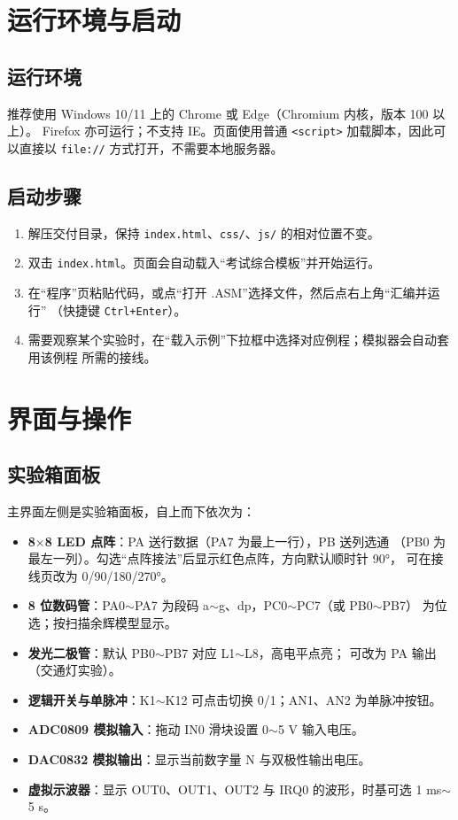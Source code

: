 \documentclass[11pt,a4paper]{ctexart}
\begin{document}
\section{运行环境与启动}

\subsection{运行环境}

推荐使用 Windows 10/11 上的 Chrome 或 Edge（Chromium 内核，版本 100 以上）。
Firefox 亦可运行；不支持 IE。页面使用普通 \texttt{<script>} 加载脚本，因此可以直接以
\texttt{file://} 方式打开，不需要本地服务器。

\subsection{启动步骤}

\begin{enumerate}
  \item 解压交付目录，保持 \texttt{index.html}、\texttt{css/}、\texttt{js/} 的相对位置不变。
  \item 双击 \texttt{index.html}。页面会自动载入“考试综合模板”并开始运行。
  \item 在“程序”页粘贴代码，或点“打开 .ASM”选择文件，然后点右上角“汇编并运行”
        （快捷键 \texttt{Ctrl+Enter}）。
  \item 需要观察某个实验时，在“载入示例”下拉框中选择对应例程；模拟器会自动套用该例程
        所需的接线。
\end{enumerate}

\section{界面与操作}

\subsection{实验箱面板}

主界面左侧是实验箱面板，自上而下依次为：

\begin{itemize}
  \item \textbf{8$\times$8 LED 点阵}：PA 送行数据（PA7 为最上一行），PB 送列选通
        （PB0 为最左一列）。勾选“点阵接法”后显示红色点阵，方向默认顺时针 90°，
        可在接线页改为 0/90/180/270°。
  \item \textbf{8 位数码管}：PA0$\sim$PA7 为段码 a$\sim$g、dp，PC0$\sim$PC7（或 PB0$\sim$PB7）
        为位选；按扫描余辉模型显示。
  \item \textbf{发光二极管}：默认 PB0$\sim$PB7 对应 L1$\sim$L8，高电平点亮；
        可改为 PA 输出（交通灯实验）。
  \item \textbf{逻辑开关与单脉冲}：K1$\sim$K12 可点击切换 0/1；AN1、AN2 为单脉冲按钮。
  \item \textbf{ADC0809 模拟输入}：拖动 IN0 滑块设置 0$\sim$5 V 输入电压。
  \item \textbf{DAC0832 模拟输出}：显示当前数字量 N 与双极性输出电压。
  \item \textbf{虚拟示波器}：显示 OUT0、OUT1、OUT2 与 IRQ0 的波形，时基可选
        1 ms$\sim$5 s。
\end{itemize}
\end{document}
